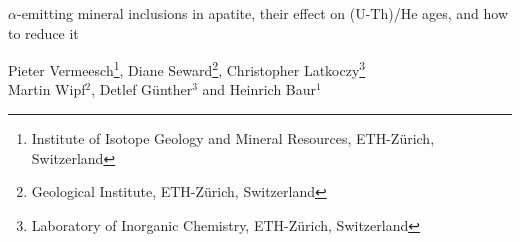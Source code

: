 \documentclass{article}
\begin{document}
\doublespace

  \begin{center}
  \begin{huge}
$\alpha$-emitting mineral inclusions in apatite, their effect
on (U-Th)/He ages, and how to reduce it\\
  \end{huge}
\vspace{0.2cm}
Pieter Vermeesch\footnote[1]{Institute of Isotope Geology and
Mineral Resources, ETH-Z\"{u}rich, Switzerland},
Diane Seward\footnote[2]{Geological Institute, ETH-Z\"{u}rich, Switzerland},
Christopher Latkoczy\footnote[3]{Laboratory of Inorganic Chemistry,
ETH-Z\"{u}rich, Switzerland}\\
Martin Wipf$^2$, Detlef G\"{u}nther$^3$ and Heinrich Baur$^1$
\vspace{0.2cm}
  \end{center}
\end{document}
